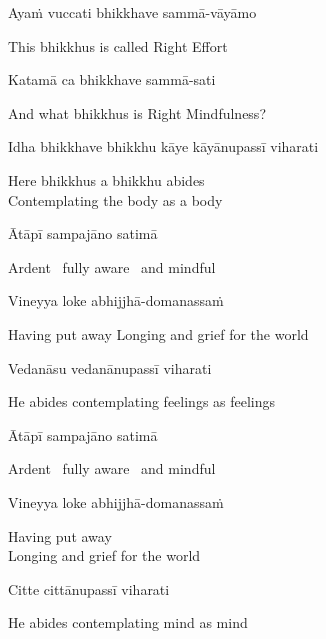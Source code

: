 Ayaṁ vuccati bhikkhave sammā-vāyāmo

\begin{english}
  This bhikkhus is called Right Effort
\end{english}

Katamā ca bhikkhave sammā-sati

\begin{english}
  And what bhikkhus is Right Mindfulness?
\end{english}

Idha bhikkhave bhikkhu kāye kāyānupassī viharati

\begin{english}
  Here bhikkhus a bhikkhu abides\\
  Contemplating the body as a body
\end{english}

Ātāpī sampajāno satimā

\begin{english}
  Ardent \breathmark\ fully aware \breathmark\ and mindful
\end{english}

Vineyya loke abhijjhā-domanassaṁ

\begin{english}
  Having put away
  Longing and grief for the world
\end{english}

Vedanāsu vedanānupassī viharati

\begin{english}
  He abides contemplating feelings as feelings
\end{english}

Ātāpī sampajāno satimā

\begin{english}
  Ardent \breathmark\ fully aware \breathmark\ and mindful
\end{english}

Vineyya loke abhijjhā-domanassaṁ

\begin{english}
  Having put away\\
  Longing and grief for the world
\end{english}

Citte cittānupassī viharati

\begin{english}
  He abides contemplating mind as mind
\end{english}

